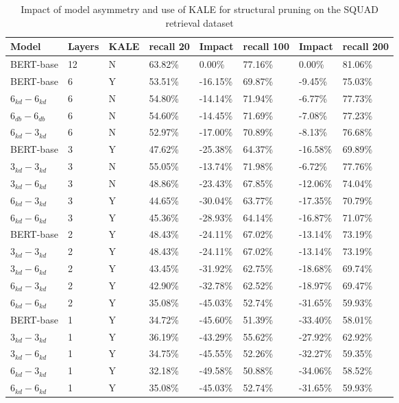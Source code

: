\begin{table*}[!ht]
    \centering
    \begin{tabular}{|l|l|l|l|l|l|l|l|}
    \hline
        Model & Layers & KALE & recall 20 & Impact & recall 100 & Impact & recall 200 \\ \hline
        BERT-base & 12 & N & 63.82\% & 0.00\% & 77.16\% & 0.00\% & 81.06\% \\ \hline
        BERT-base & 6 & Y & 53.51\% & -16.15\% & 69.87\% & -9.45\% & 75.03\% \\ \hline
        $6_{kd}-6_{kd}$ & 6 & N & 54.80\% & -14.14\% & 71.94\% & -6.77\% & 77.73\% \\ \hline
        $6_{db}-6_{db}$ & 6 & N & 54.60\% & -14.45\% & 71.69\% & -7.08\% & 77.23\% \\ \hline
        $6_{kd}-3_{kd}$ & 6 & N & 52.97\% & -17.00\% & 70.89\% & -8.13\% & 76.68\% \\ \hline
        BERT-base & 3 & Y & 47.62\% & -25.38\% & 64.37\% & -16.58\% & 69.89\% \\ \hline
        $3_{kd}-3_{kd}$ & 3 & N & 55.05\% & -13.74\% & 71.98\% & -6.72\% & 77.76\% \\ \hline
        $3_{kd}-6_{kd}$ & 3 & N & 48.86\% & -23.43\% & 67.85\% & -12.06\% & 74.04\% \\ \hline
        $6_{kd}-3_{kd}$ & 3 & Y & 44.65\% & -30.04\% & 63.77\% & -17.35\% & 70.79\% \\ \hline
        $6_{kd}-6_{kd}$ & 3 & Y & 45.36\% & -28.93\% & 64.14\% & -16.87\% & 71.07\% \\ \hline
        BERT-base & 2 & Y & 48.43\% & -24.11\% & 67.02\% & -13.14\% & 73.19\% \\ \hline
        $3_{kd}-3_{kd}$ & 2 & Y & 48.43\% & -24.11\% & 67.02\% & -13.14\% & 73.19\% \\ \hline
        $3_{kd}-6_{kd}$ & 2 & Y & 43.45\% & -31.92\% & 62.75\% & -18.68\% & 69.74\% \\ \hline
        $6_{kd}-3_{kd}$ & 2 & Y & 42.90\% & -32.78\% & 62.52\% & -18.97\% & 69.47\% \\ \hline
        $6_{kd}-6_{kd}$ & 2 & Y & 35.08\% & -45.03\% & 52.74\% & -31.65\% & 59.93\% \\ \hline
        BERT-base & 1 & Y & 34.72\% & -45.60\% & 51.39\% & -33.40\% & 58.01\% \\ \hline
        $3_{kd}-3_{kd}$ & 1 & Y & 36.19\% & -43.29\% & 55.62\% & -27.92\% & 62.92\% \\ \hline
        $3_{kd}-6_{kd}$ & 1 & Y & 34.75\% & -45.55\% & 52.26\% & -32.27\% & 59.35\% \\ \hline
        $6_{kd}-3_{kd}$ & 1 & Y & 32.18\% & -49.58\% & 50.88\% & -34.06\% & 58.52\% \\ \hline
        $6_{kd}-6_{kd}$ & 1 & Y & 35.08\% & -45.03\% & 52.74\% & -31.65\% & 59.93\% \\ \hline
    \end{tabular}
    \caption{Impact of model asymmetry and use of KALE for structural pruning on the SQUAD retrieval dataset}
    \label{tab:kale+asym-squad}
\end{table*}

